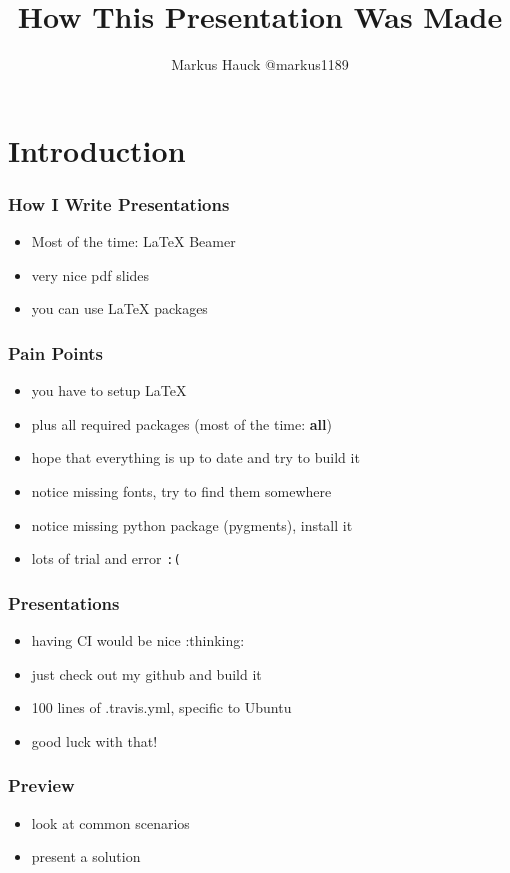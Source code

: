 \documentclass{beamer}
\title{How This Presentation Was Made}
\author{Markus Hauck @markus1189}
\begin{document}
\begin{frame}
  \titlepage{}
\end{frame}

\section{Introduction}\label{sec:introduction}

\begin{frame}
  \frametitle{How I Write Presentations}
  \begin{itemize}
  \item Most of the time: LaTeX Beamer
  \item very nice pdf slides
  \item you can use LaTeX packages
  \end{itemize}
\end{frame}

\begin{frame}
  \frametitle{Pain Points}
  \begin{itemize}
  \item you have to setup LaTeX
  \item plus all required packages (most of the time: \textbf{all})
  \item hope that everything is up to date and try to build it
  \item notice missing fonts, try to find them somewhere
  \item notice missing python package (pygments), install it
  \item lots of trial and error \texttt{:(}
  \end{itemize}
\end{frame}

\begin{frame}
  \frametitle{Presentations}
  \begin{itemize}
  \item having CI would be nice :thinking:
  \item just check out my github and build it
  \item 100 lines of .travis.yml, specific to Ubuntu
  \item good luck with that!
  \end{itemize}
\end{frame}

\begin{frame}
  \frametitle{Preview}
  \begin{itemize}
  \item look at common scenarios
  \item present a solution
  \end{itemize}
\end{frame}
\end{document}

